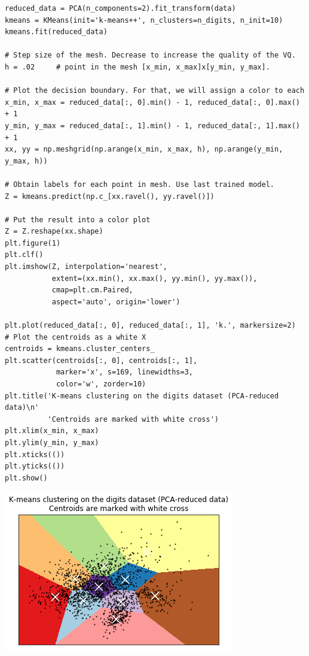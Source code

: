 \begin{verbatim}
reduced_data = PCA(n_components=2).fit_transform(data)
kmeans = KMeans(init='k-means++', n_clusters=n_digits, n_init=10)
kmeans.fit(reduced_data)

# Step size of the mesh. Decrease to increase the quality of the VQ.
h = .02     # point in the mesh [x_min, x_max]x[y_min, y_max].

# Plot the decision boundary. For that, we will assign a color to each
x_min, x_max = reduced_data[:, 0].min() - 1, reduced_data[:, 0].max() + 1
y_min, y_max = reduced_data[:, 1].min() - 1, reduced_data[:, 1].max() + 1
xx, yy = np.meshgrid(np.arange(x_min, x_max, h), np.arange(y_min, y_max, h))

# Obtain labels for each point in mesh. Use last trained model.
Z = kmeans.predict(np.c_[xx.ravel(), yy.ravel()])

# Put the result into a color plot
Z = Z.reshape(xx.shape)
plt.figure(1)
plt.clf()
plt.imshow(Z, interpolation='nearest',
           extent=(xx.min(), xx.max(), yy.min(), yy.max()),
           cmap=plt.cm.Paired,
           aspect='auto', origin='lower')

plt.plot(reduced_data[:, 0], reduced_data[:, 1], 'k.', markersize=2)
# Plot the centroids as a white X
centroids = kmeans.cluster_centers_
plt.scatter(centroids[:, 0], centroids[:, 1],
            marker='x', s=169, linewidths=3,
            color='w', zorder=10)
plt.title('K-means clustering on the digits dataset (PCA-reduced data)\n'
          'Centroids are marked with white cross')
plt.xlim(x_min, x_max)
plt.ylim(y_min, y_max)
plt.xticks(())
plt.yticks(())
plt.show()
\end{verbatim}

\includegraphics{scikit-learn-k-means_files/scikit-learn-k-means_10_0.png}
